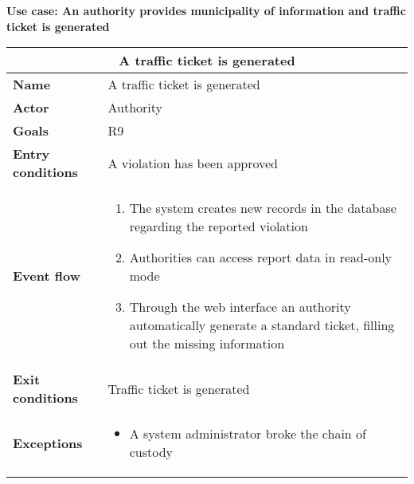 \begin{description}
    \item \textbf{Use case: An authority provides municipality of information and traffic ticket is generated}
    \begin{center}
        \begin{tabular}{|p{3cm}|p{7cm}|}
            \multicolumn{2}{c}{\textbf{A traffic ticket is generated}} \\
            \hline
            \textbf{Name} & A traffic ticket is generated \\
            \hline
            \textbf{Actor} & Authority \\
            \hline
            \textbf{Goals} & R9 \\
            \hline
            \textbf{Entry conditions} & A violation has been approved \\
            \hline
            \textbf{Event flow} &
            \begin{enumerate}
                \item The system creates new records in the database regarding the reported violation
                \item Authorities can access report data in read-only mode
                \item Through the web interface an authority automatically generate a standard ticket, filling out the missing information
            \end{enumerate} \\
            \hline
            \textbf{Exit conditions} & Traffic ticket is generated \\
            \hline
            \textbf{Exceptions}
            & \begin{itemize}
                \item A system administrator broke the chain of custody
            \end{itemize} \\
            \hline
        \end{tabular}
    \end{center}
\end{description}